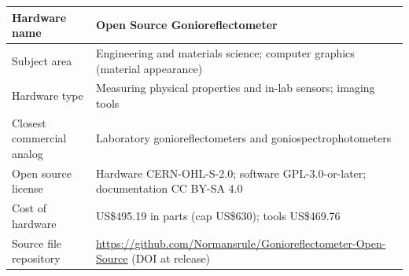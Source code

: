 \begin{tabularx}{\linewidth}{|l|X|}\hline
Hardware name & Open Source Gonioreflectometer \\ \hline
Subject area & Engineering and materials science; computer graphics (material appearance) \\ \hline
Hardware type & Measuring physical properties and in-lab sensors; imaging tools \\ \hline
Closest commercial analog & Laboratory gonioreflectometers and goniospectrophotometers \\ \hline
Open source license & Hardware CERN-OHL-S-2.0; software GPL-3.0-or-later; documentation CC BY-SA 4.0 \\ \hline
Cost of hardware & US\$495.19 in parts (cap US\$630); tools US\$469.76 \\ \hline
Source file repository & \url{https://github.com/Normansrule/Gonioreflectometer-Open-Source} (DOI at release) \\ \hline
\end{tabularx}
